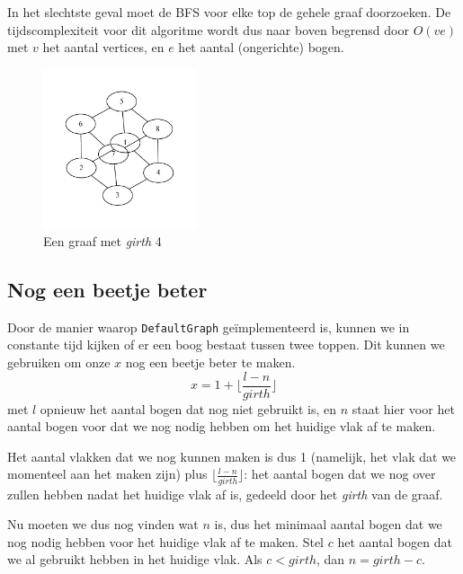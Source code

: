 \documentclass{article}
\begin{document}
In het slechtste geval moet de BFS voor elke top de gehele graaf doorzoeken. De
tijdscomplexiteit voor dit algoritme wordt dus naar boven begrensd door $O(ve)$
met $v$ het aantal vertices, en $e$ het aantal (ongerichte) bogen.

\begin{figure}
\begin{center}
\includegraphics[width=0.4\textwidth]{images/cube.pdf}
\caption{Een graaf met \emph{girth} 4}
\label{fig:cube}
\end{center}
\end{figure}

\subsection{Nog een beetje beter}
Door de manier waarop \verb#DefaultGraph# ge\"implementeerd is, kunnen we
in constante tijd kijken of er een boog bestaat tussen twee toppen. Dit kunnen
we gebruiken om onze $x$ nog een beetje beter te maken.
\begin{equation*}
x = 1 + \lfloor\frac{l - n}{girth}\rfloor
\end{equation*}
met $l$ opnieuw het aantal bogen dat nog niet gebruikt is, en $n$ staat hier
voor het aantal bogen voor dat we nog nodig hebben om het huidige vlak af te
maken.
\newline

Het aantal vlakken dat we nog kunnen maken is dus 1 (namelijk, het vlak dat we
momenteel aan het maken zijn) plus $\lfloor\frac{l - n}{girth}\rfloor$:
het aantal bogen dat we nog over zullen hebben nadat het huidige vlak af is,
gedeeld door het \emph{girth} van de graaf.
\newline

Nu moeten we dus nog vinden wat $n$ is, dus het minimaal aantal bogen dat we
nog nodig hebben voor het huidige vlak af te maken. Stel $c$ het aantal bogen
dat we al gebruikt hebben in het huidige vlak. Als $c < girth$, dan
$n = girth - c$.
\newline
\end{document}
